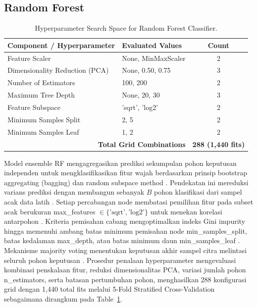 \subsection{Random Forest}
\label{sec:random_forest}

\begin{table}[htbp]
\caption{Hyperparameter Search Space for Random Forest Classifier.}
\label{tab:III}
\centering
\begin{tabular}{llc}
\toprule
Component / Hyperparameter & Evaluated Values & Count \\
\midrule
Feature Scaler & None, MinMaxScaler & 2 \\
Dimensionality Reduction (PCA) & None, 0.50, 0.75 & 3 \\
Number of Estimators & 100, 200 & 2 \\
Maximum Tree Depth & None, 20, 30 & 3 \\
Feature Subspace & 'sqrt', 'log2' & 2 \\
Minimum Samples Split & 2, 5 & 2 \\
Minimum Samples Leaf & 1, 2 & 2 \\
\midrule
\multicolumn{2}{r}{\textbf{Total Grid Combinations}} & \textbf{288 (1,440 fits)} \\
\bottomrule
\end{tabular}
\end{table}

Model ensemble RF mengagregasikan prediksi sekumpulan pohon keputusan independen untuk mengklasifikasikan fitur wajah berdasarkan prinsip bootstrap aggregating (bagging) dan random subspace method \cite{ref30}. Pendekatan ini mereduksi varians prediksi dengan membangun sebanyak $B$ pohon klasifikasi dari sampel acak data latih \cite{ref31}. Setiap percabangan node membatasi pemilihan fitur pada subset acak berukuran max\_features $\in \{\text{'sqrt'}, \text{'log2'}\}$ untuk menekan korelasi antarpohon \cite{ref32}. Kriteria pemisahan cabang mengoptimalkan indeks Gini impurity hingga memenuhi ambang batas minimum pemisahan node min\_samples\_split, batas kedalaman max\_depth, atau batas minimum daun min\_samples\_leaf \cite{ref33}. Mekanisme majority voting menentukan keputusan akhir sampel citra melintasi seluruh pohon keputusan \cite{ref34}. Prosedur penalaan hyperparameter mengevaluasi kombinasi penskalaan fitur, reduksi dimensionalitas PCA, variasi jumlah pohon n\_estimators, serta batasan pertumbuhan pohon, menghasilkan 288 konfigurasi grid dengan 1,440 total fits melalui 5-Fold Stratified Cross-Validation sebagaimana dirangkum pada Table~\ref{tab:III}.
